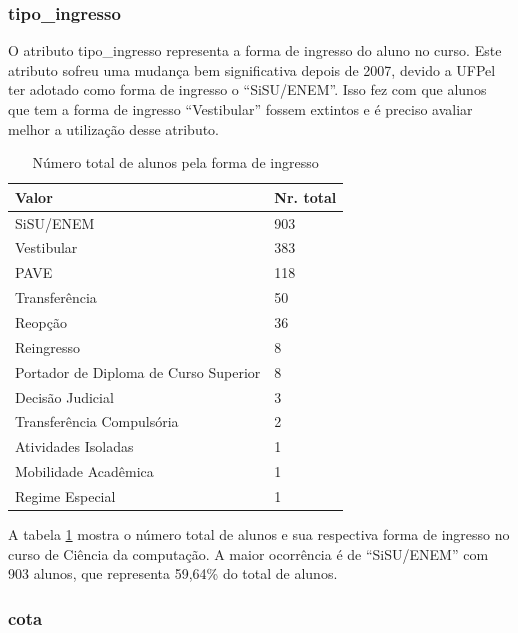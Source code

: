\documentclass[diss,capa]{texufpel}
\begin{document}
\subsubsection{tipo\_ingresso}

O atributo tipo\_ingresso representa a forma de ingresso do aluno no curso.
Este atributo sofreu uma mudança bem significativa depois de 2007, devido a UFPel ter adotado como forma de ingresso o ``SiSU/ENEM''. Isso fez com que alunos que tem a forma de ingresso ``Vestibular'' fossem extintos e é preciso avaliar melhor a utilização desse atributo.

\begin{table}[htbp]
\begin{center}
\caption{Número total de alunos pela forma de ingresso}
\label{tab:total-aluno-tipo-ingresso}
\begin{tabular}{p{8.5cm}|p{6.5cm}} \hline
Valor                                   & Nr. total \\ \hline
SiSU/ENEM                               & 903 \\
Vestibular                              & 383 \\
PAVE                                    & 118 \\
Transferência                           & 50 \\
Reopção                                 & 36 \\
Reingresso                              & 8 \\
Portador de Diploma de Curso Superior   & 8 \\
Decisão Judicial                        & 3 \\
Transferência Compulsória               & 2 \\
Atividades Isoladas                     & 1 \\
Mobilidade Acadêmica                    & 1 \\
Regime Especial                         & 1 \\ \hline
\end{tabular}
\end{center}
\end{table}

A tabela \ref{tab:total-aluno-tipo-ingresso} mostra o número total de alunos e sua respectiva forma de ingresso no curso de Ciência da computação.
A maior ocorrência é de ``SiSU/ENEM'' com 903 alunos, que representa 59,64\% do total de alunos.


\subsubsection{cota}
\end{document}
